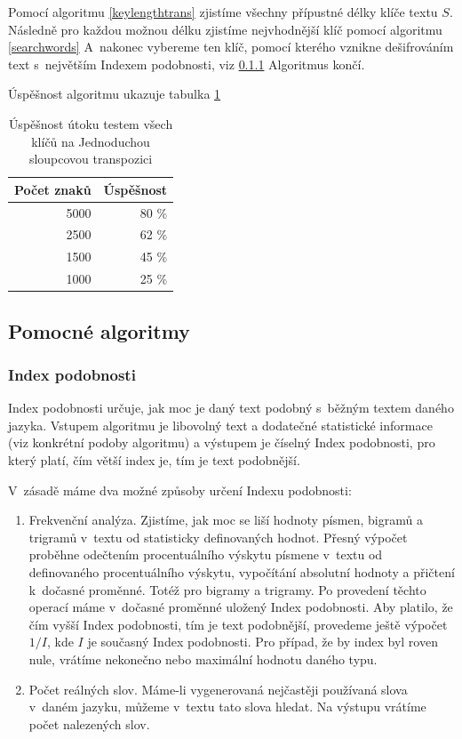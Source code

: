 \documentclass[12pt]{article}
\theoremstyle{definition}
\begin{document}
Pomocí algoritmu \ref{keylengthtrans} zjistíme všechny přípustné délky klíče textu $S$. Následně pro každou možnou délku zjistíme nejvhodnější klíč pomocí algoritmu \ref{searchwords} A~nakonec vybereme ten klíč, pomocí kterého vznikne dešifrováním text s~největším Indexem podobnosti, viz \ref{indexpodobnosti} Algoritmus končí. 

Úspěšnost algoritmu ukazuje tabulka \ref{tabtrans}

\begin{table}[ht]
  \begin{center}
    \begin{tabular}{|r|r|}
    \hline
    Počet znaků&Úspěšnost\\
    \hline
    5000&80 \%\\
    2500&62 \%\\
    1500&45 \%\\
    1000&25 \%\\
    \hline
    \end{tabular}
    \caption{Úspěšnost útoku testem všech klíčů na Jednoduchou sloupcovou transpozici} 
    \label{tabtrans}
  \end{center}
\end{table}


\newpage
\subsection{Pomocné algoritmy}
\subsubsection{Index podobnosti}
\label{indexpodobnosti}
Index podobnosti určuje, jak moc je daný text podobný s~běžným textem daného jazyka. Vstupem algoritmu je libovolný text a dodatečné statistické informace (viz konkrétní podoby algoritmu) a výstupem je číselný Index podobnosti, pro který platí, čím větší index je, tím je text podobnější. 

V~zásadě máme dva možné způsoby určení Indexu podobnosti:

\begin{enumerate}
\item Frekvenční analýza. Zjistíme, jak moc se liší hodnoty písmen, bigramů a trigramů v~textu od statisticky definovaných hodnot. Přesný výpočet proběhne odečtením procentuálního výskytu písmene v~textu od definovaného procentuálního výskytu, vypočítání absolutní hodnoty a přičtení k~dočasné proměnné. Totéž pro bigramy a trigramy. Po provedení těchto operací máme v~dočasné proměnné uložený Index podobnosti. Aby platilo, že čím vyšší Index podobnosti, tím je text podobnější, provedeme ještě výpočet $1/I$, kde $I$ je současný Index podobnosti. Pro případ, že by index byl roven nule, vrátíme nekonečno nebo maximální hodnotu daného typu.  
\item Počet reálných slov. Máme-li vygenerovaná nejčastěji používaná slova v~daném jazyku, můžeme v~textu tato slova hledat. Na výstupu vrátíme počet nalezených slov. 
\end{enumerate}
\end{document}
